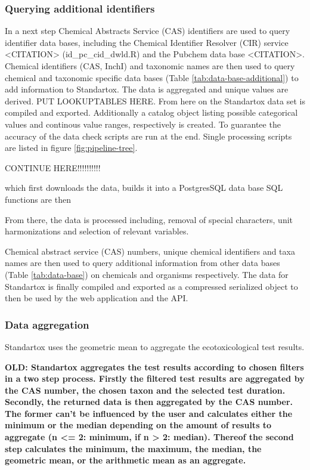 \subsubsection*{Querying additional identifiers}
In a next step Chemical Abstracts Service (CAS) identifiers are used to query identifier data bases, including the Chemical Identifier Resolver (CIR) service <CITATION> (id\_pc\_cid\_dwld.R) and the Pubchem data base <CITATION>. Chemical identifiers (CAS, InchI) and taxonomic names are then used to query chemical and taxonomic specific data bases (Table \ref{tab:data-base-additional}) to add information to Standartox. The data is aggregated and unique values are derived. PUT LOOKUPTABLES HERE. From here on the Standartox data set is compiled and exported. Additionally a catalog object listing possible categorical values and continous value ranges, respectively is created. To guarantee the accuracy of the data check scripts are run at the end. Single processing scripts are listed in figure \ref{fig:pipeline-tree}.

CONTINUE HERE!!!!!!!!!!


which first downloads the data, builds it into a PostgresSQL data base SQL functions are then 

From there, the data is processed including, removal of special characters, unit harmonizations and selection of relevant variables.

Chemical abstract service (CAS) numbers, unique chemical identifiers and taxa names are then used to query additional information from other data bases (Table \ref{tab:data-base}) on chemicals and organisms respectively. The data for Standartox is finally compiled and exported as a compressed serialized object to then be used by the web application and the API.

\subsubsection*{Data aggregation}
Standartox uses the geometric mean to aggregate the ecotoxicological test results.


\textbf{OLD: Standartox aggregates the test results according to chosen filters in a two step process. Firstly the filtered test results are aggregated by the CAS number, the chosen taxon and the selected test duration. Secondly, the returned data is then aggregated by the CAS number. The former can't be influenced by the user and calculates either the minimum or the median depending on the amount of results to aggregate (n <= 2: minimum, if n > 2: median). Thereof the second step calculates the minimum, the maximum, the median, the geometric mean, or the arithmetic mean as an aggregate.}


